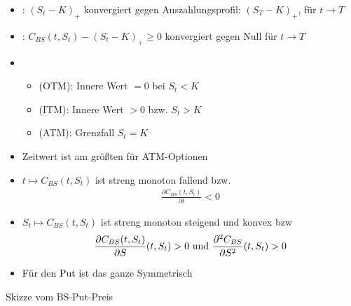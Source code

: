 \begin{itemize}
	\item {}: $(S_t -K)_+$ konvergiert gegen Auszahlungsprofil: $(S_T - K)_+$, für $t \to T$
	\item {}: $C_{BS}(t,S_t) - (S_t - K)_+ \ge 0$ konvergiert gegen Null für $t \to T$
	\item 
	\begin{itemize}
		\item {} (OTM): Innere Wert $=0$ bei $S_t < K$
		\item {} (ITM): Innere Wert $>0$ bzw. $S_t > K$
		\item {} (ATM): Grenzfall $S_t = K$
	\end{itemize}
	\item Zeitwert ist am größten für ATM-Optionen
	\item $t \mapsto C_{BS}(t,S_t)$ ist streng monoton fallend bzw.
	\begin{align*}
	\frac{\partial C_{BS}(t,S_t)}{\partial t} < 0
	\end{align*}
	\item $S_t \mapsto C_{BS}(t,S_t)$ ist streng monoton steigend und konvex bzw
	\begin{align*}
	\frac{\partial C_{BS}(t,S_t)}{\partial S}(t,S_t) > 0 \text{ und } \frac{\partial^2 C_{BS}}{\partial S^2}(t,S_t) > 0
	\end{align*}
	\item Für den Put ist das ganze Symmetrisch
\end{itemize}
Skizze vom BS-Put-Preis
